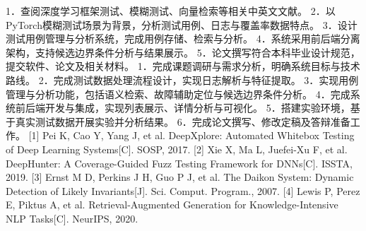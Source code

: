 \assignReq
{1．查阅深度学习框架测试、模糊测试、向量检索等相关中英文文献。}
{2．以PyTorch模糊测试场景为背景，分析测试用例、日志与覆盖率数据特点。}
{3．设计测试用例管理与分析系统，完成用例存储、检索与分析。}
{4．系统采用前后端分离架构，支持候选边界条件分析与结果展示。}
{5．论文撰写符合本科毕业设计规范，提交软件、论文及相关材料。}
\assignWork
{1．完成课题调研与需求分析，明确系统目标与技术路线。}
{2．完成测试数据处理流程设计，实现日志解析与特征提取。}
{3．实现用例管理与分析功能，包括语义检索、故障辅助定位与候选边界条件分析。}
{4．完成系统前后端开发与集成，实现列表展示、详情分析与可视化。}
{5．搭建实验环境，基于真实测试数据开展实验并分析结果。}
{6．完成论文撰写、修改定稿及答辩准备工作。}
\assignRef
{[1] Pei K, Cao Y, Yang J, et al. DeepXplore:}
{\hspace*{1.8em}Automated Whitebox Testing of Deep Learning Systems[C]. SOSP, 2017.}
{[2] Xie X, Ma L, Juefei-Xu F, et al. DeepHunter:}
{\hspace*{1.8em}A Coverage-Guided Fuzz Testing Framework for DNNs[C]. ISSTA, 2019.}
{[3] Ernst M D, Perkins J H, Guo P J, et al. The Daikon System:}
{\hspace*{1.8em}Dynamic Detection of Likely Invariants[J]. Sci. Comput. Program., 2007.}
{[4] Lewis P, Perez E, Piktus A, et al. Retrieval-Augmented Generation}
{\hspace*{1.8em}for Knowledge-Intensive NLP Tasks[C]. NeurIPS, 2020.}
